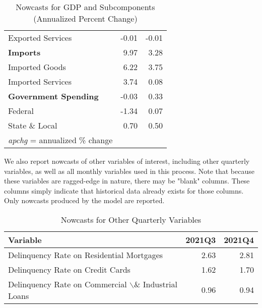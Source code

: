 \documentclass[11pt, letterpaper]{article}\usepackage[]{graphicx}\usepackage[]{color}
\begin{document}
\begin{table}[H]
\begin{tabular}{lrr}
  \hspace{8mm}  Exported Services & -0.01 & -0.01 \\ 
  \hspace{0mm} \textbf{Imports} & 9.97 & 3.28 \\ 
  \hspace{8mm}  Imported Goods & 6.22 & 3.75 \\ 
  \hspace{8mm}  Imported Services & 3.74 & 0.08 \\ 
  \hspace{0mm} \textbf{Government Spending} & -0.03 & 0.33 \\ 
  \hspace{8mm}  Federal & -1.34 & 0.07 \\ 
  \hspace{8mm}  State \& Local & 0.70 & 0.50 \\ 
   \hline 
 \textit{apchg} = annualized \% change 
\end{tabular}
\endgroup
\caption{Nowcasts for GDP and Subcomponents (Annualized Percent Change)} 
\end{table}


We also report nowcasts of other variables of interest, including other quarterly variables, as well as all monthly variables used in this process. Note that because these variables are ragged-edge in nature, there may be "blank" columns. These columns simply indicate that historical data already exists for those columns. Only nowcasts produced by the model are reported.
\begin{table}[H]
\centering
\begingroup\fontsize{11pt}{13pt}\selectfont
\begin{tabular}{lrr}
  \hline
Variable & 2021Q3 & 2021Q4 \\ 
  \hline
Delinquency Rate on Residential Mortgages & 2.63 & 2.81 \\ 
  Delinquency Rate on Credit Cards & 1.62 & 1.70 \\ 
  Delinquency Rate on Commercial $\backslash$\& Industrial Loans & 0.96 & 0.94 \\ 
   \hline
\end{tabular}
\endgroup
\caption{Nowcasts for Other Quarterly Variables} 
\end{table}
\end{document}

